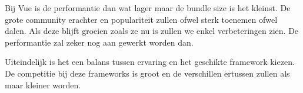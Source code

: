 Bij Vue is de performantie dan wat lager maar de bundle size is het kleinst. De grote community erachter en populariteit zullen ofwel sterk toenemen ofwel dalen. Als deze blijft groeien zoals ze nu is zullen we enkel verbeteringen zien. De performantie zal zeker nog aan gewerkt worden dan.

Uiteindelijk is het een balans tussen ervaring en het geschikte framework kiezen. De competitie bij deze frameworks is groot en de verschillen ertussen zullen als maar kleiner worden.

